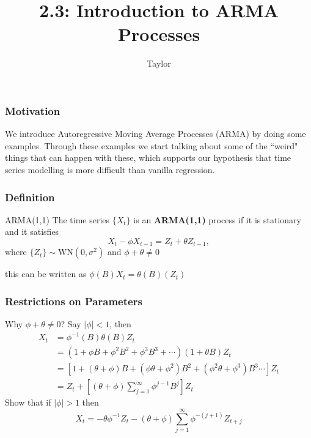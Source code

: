 \documentclass{beamer}
\title["2.3"]{2.3: Introduction to ARMA Processes}
\author{Taylor}
\institute[UVA] 
{
University of Virginia \\
\medskip
\textit{} 
}
\date{}
\begin{document}

\begin{frame}
\titlepage 
\end{frame}

\begin{frame}
\frametitle{Motivation}

We introduce Autoregressive Moving Average Processes (ARMA) by doing some examples. Through these examples we start talking about some of the ``weird" things that can happen with these, which supports our hypothesis that time series modelling is more difficult than vanilla regression.

\end{frame}


\begin{frame}
\frametitle{Definition}

\begin{block}{ARMA(1,1)}
The time series $\{X_t\}$ is an {\bf ARMA(1,1)} process if it is stationary and it satisfies
\[
X_t - \phi X_{t-1} = Z_t + \theta Z_{t-1},
\]
where $\{Z_t\} \sim \text{WN}(0,\sigma^2)$ and $\phi + \theta \neq 0$
\end{block}
this can be written as $\phi(B)X_t = \theta(B)(Z_t)$
\end{frame}



\begin{frame}
\frametitle{Restrictions on Parameters}
Why  $\phi + \theta \neq 0$? Say $|\phi|<1$, then
\begin{align*}
X_t &= \phi^{-1}(B)\theta(B)Z_t \\
&= (1 + \phi B + \phi^2 B^2 + \phi^3B^3  + \cdots)(1 + \theta B)Z_t\\
&= [1 + (\theta + \phi)B + (\phi\theta + \phi^2 )B^2 + (\phi^2 \theta+\phi^3)B^3\cdots]Z_t \\
&= Z_t + \left[ (\theta + \phi)\sum_{j=1}^{\infty} \phi^{j-1} B^j \right] Z_t
\end{align*}
Show that if $|\phi|>1$ then
\[
X_t = -\theta\phi^{-1}Z_t - (\theta+\phi) \sum_{j=1}^{\infty} \phi^{-(j+1)}Z_{t+j}
\]
\end{frame}
\end{document}

